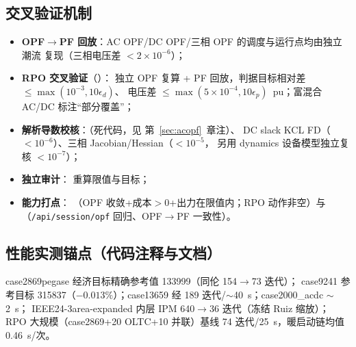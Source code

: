 \subsection{交叉验证机制}
\begin{itemize}
  \item \textbf{OPF$\to$PF 回放}：AC OPF/DC OPF/三相 OPF 的调度与运行点均由独立潮流
        复现（三相电压差 $<2\times10^{-6}$）；
  \item \textbf{RPO 交叉验证}（）：
        独立 OPF 复算 + PF 回放，判据目标相对差 $\le\max(10^{-3},10\epsilon_d)$、
        电压差 $\le\max(5\times10^{-4},10\epsilon_p)$~pu；富混合 AC/DC 标注“部分覆盖”；
  \item \textbf{解析导数校核}：（死代码，见
        第~\ref{sec:acopf}~章注）、
        DC slack KCL FD（$<10^{-6}$）、三相 Jacobian/Hessian（$<10^{-5}$，
        另用 dynamics 设备模型独立复核 $<10^{-7}$）；
  \item \textbf{独立审计}： 重算限值与目标；
  \item \textbf{能力打点}：
        （OPF 收敛+成本$>$0+出力在限值内；RPO 动作非空）与
        （\texttt{/api/session/opf} 回归、OPF$\to$PF 一致性）。
\end{itemize}

\subsection{性能实测锚点（代码注释与文档）}
case2869pegase 经济目标精确参考值 133999（同伦 154$\to$73 迭代）；
case9241 参考目标 315837（$-0.013\%$）；case13659 经 
189 迭代/$\sim$40~s；case2000\_acdc $\sim$2~s；
IEEE24-3area-expanded 内层 IPM 640$\to$36 迭代（冻结 Ruiz 缩放）；
RPO 大规模（case2869+20 OLTC+10 并联）基线 74 迭代/25~s，暖启动链均值 0.46~s/次。

